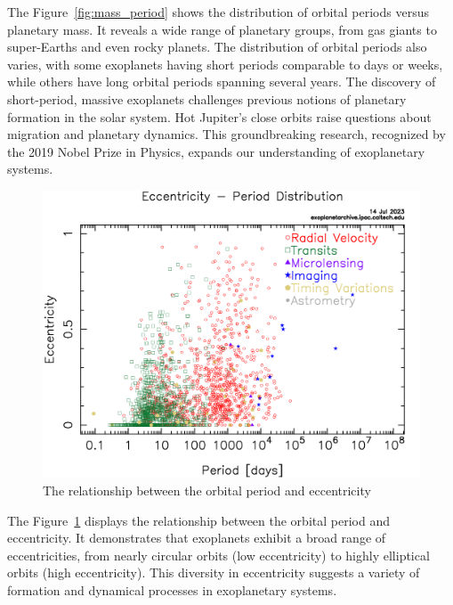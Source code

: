 \documentclass{article}
\begin{document}
The Figure~\ref{fig:mass_period} shows the distribution of orbital periods versus planetary mass. It reveals a wide range of planetary groups, from gas giants to super-Earths and even rocky planets. The distribution of orbital periods also varies, with some exoplanets having short periods comparable to days or weeks, while others have long orbital periods spanning several years. The discovery of short-period, massive exoplanets challenges previous notions of planetary formation in the solar system. Hot Jupiter's close orbits raise questions about migration and planetary dynamics. This groundbreaking research, recognized by the 2019 Nobel Prize in Physics, expands our understanding of exoplanetary systems.

\begin{figure}[H]
    \centering
    \includegraphics[width=1\linewidth]{image/ecc_period.png}
    \captionsetup{font=small} 
    \caption{The relationship between the orbital period and eccentricity}
    \label{fig:ecc_period}
\end{figure}

The Figure~\ref{fig:ecc_period} displays the relationship between the orbital period and eccentricity. It demonstrates that exoplanets exhibit a broad range of eccentricities, from nearly circular orbits (low eccentricity) to highly elliptical orbits (high eccentricity). This diversity in eccentricity suggests a variety of formation and dynamical processes in exoplanetary systems.
\end{document}
